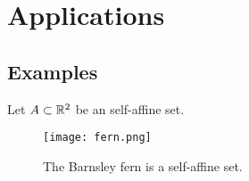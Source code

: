 
\chapter{Applications}

\section{Examples}

\begin{example}
	Let $ A \subset \euclid[2] $ be an self-affine set.
	\begin{figure}[H]
		\centering
		\texttt{[image: fern.png]}
		\caption[A self-affine set]{The Barnsley fern is a self-affine set\footnotemark.}
	\end{figure}
\end{example}
